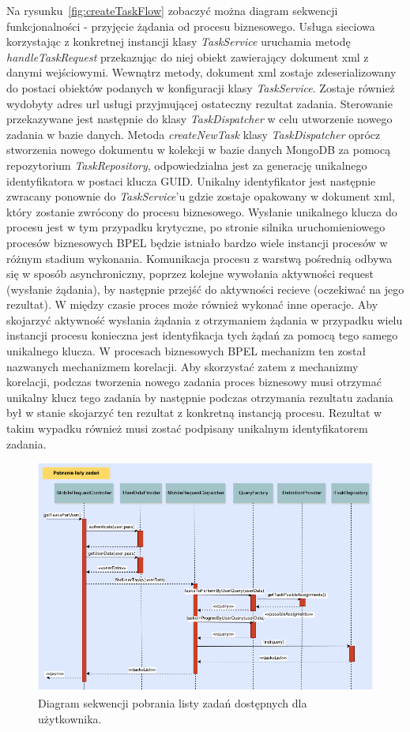 Na rysunku~\ref{fig:createTaskFlow} zobaczyć można diagram sekwencji funkcjonalności - przyjęcie żądania od procesu biznesowego. Usługa sieciowa korzystając z konkretnej instancji klasy \textit{TaskService} uruchamia metodę \textit{handleTaskRequest} przekazując do niej obiekt zawierający dokument xml z danymi wejściowymi. Wewnątrz metody, dokument xml zostaje zdeserializowany do postaci obiektów podanych w konfiguracji klasy \textit{TaskService}. Zostaje również wydobyty adres url usługi przyjmującej ostateczny rezultat zadania. Sterowanie przekazywane jest następnie do klasy \textit{TaskDispatcher} w celu utworzenie nowego zadania w bazie danych. Metoda \textit{createNewTask} klasy \textit{TaskDispatcher} oprócz stworzenia nowego dokumentu w kolekcji w bazie danych MongoDB za pomocą repozytorium \textit{TaskRepository}, odpowiedzialna jest za generację unikalnego identyfikatora w postaci klucza GUID. Unikalny identyfikator jest następnie zwracany ponownie do \textit{TaskService}'u gdzie zostaje opakowany w dokument xml, który zostanie zwrócony do procesu biznesowego. Wysłanie unikalnego klucza do procesu jest w tym przypadku krytyczne, po stronie silnika uruchomieniowego procesów biznesowych BPEL będzie istniało bardzo wiele instancji procesów w różnym stadium wykonania. Komunikacja procesu z warstwą pośrednią odbywa się w sposób asynchroniczny, poprzez kolejne wywołania aktywności request (wysłanie żądania), by następnie przejść do aktywności recieve (oczekiwać na jego rezultat). W między czasie proces może również wykonać inne operacje. Aby skojarzyć aktywność wysłania żądania z otrzymaniem żądania w przypadku wielu instancji procesu konieczna jest identyfikacja tych żądań za pomocą tego samego unikalnego klucza. W procesach biznesowych BPEL mechanizm ten został nazwanych mechanizmem korelacji.  Aby skorzystać zatem z mechanizmy korelacji, podczas tworzenia nowego zadania proces biznesowy musi otrzymać unikalny klucz tego zadania by następnie podczas otrzymania rezultatu zadania był w stanie skojarzyć ten rezultat z konkretną instancją procesu. Rezultat w takim wypadku również musi zostać podpisany unikalnym identyfikatorem zadania. 

\begin{figure}[h]
\centerline{\includegraphics[scale=0.5]{tasksListFlow}}
\caption{Diagram sekwencji pobrania listy zadań dostępnych dla użytkownika.}
\label{fig:tasksListFlow}
\end{figure}

